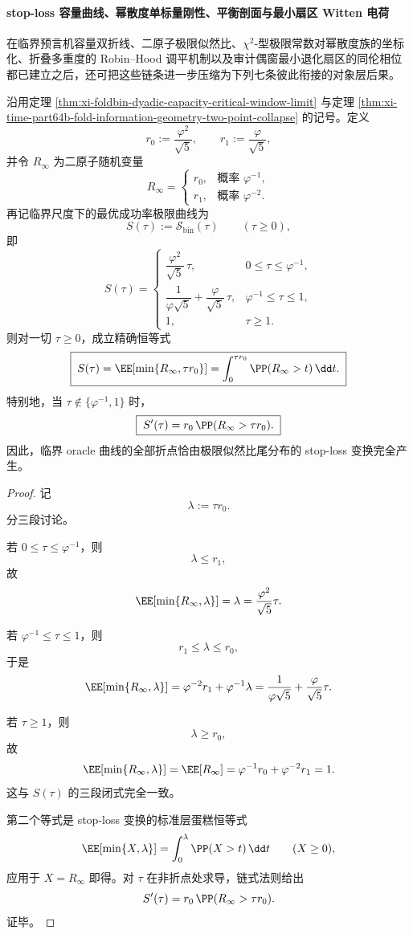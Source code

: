 \paragraph{stop-loss 容量曲线、幂散度单标量刚性、平衡剖面与最小扇区 Witten 电荷}
在临界预言机容量双折线、二原子极限似然比、\(\chi^2\)-型极限常数对幂散度族的坐标化、折叠多重度的 Robin--Hood 调平机制以及审计偶窗最小退化扇区的同伦相位都已建立之后，还可把这些链条进一步压缩为下列七条彼此衔接的对象层后果。

\begin{theorem}\label{thm:xi-time-part64ba-critical-oracle-stoploss-transform}
沿用定理 \ref{thm:xi-foldbin-dyadic-capacity-critical-window-limit} 与定理 \ref{thm:xi-time-part64b-fold-information-geometry-two-point-collapse} 的记号。定义
\[
r_0:=\frac{\varphi^2}{\sqrt5},
\qquad
r_1:=\frac{\varphi}{\sqrt5},
\]
并令 \(R_\infty\) 为二原子随机变量
\[
R_\infty=
\begin{cases}
r_0,& \text{概率 } \varphi^{-1},\\[1mm]
r_1,& \text{概率 } \varphi^{-2}.
\end{cases}
\]
再记临界尺度下的最优成功率极限曲线为
\[
S(\tau):=\mathcal S_{\mathrm{bin}}(\tau)
\qquad (\tau\ge 0),
\]
即
\[
S(\tau)=
\begin{cases}
\dfrac{\varphi^2}{\sqrt5}\,\tau,& 0\le \tau\le \varphi^{-1},\\[3mm]
\dfrac{1}{\varphi\sqrt5}+\dfrac{\varphi}{\sqrt5}\,\tau,& \varphi^{-1}\le \tau\le 1,\\[3mm]
1,& \tau\ge 1.
\end{cases}
\]
则对一切 \(\tau\ge 0\)，成立精确恒等式
\[
\boxed{\;
S(\tau)=\EE\!\left[\min\{R_\infty,\tau r_0\}\right]
=
\int_{0}^{\tau r_0}\PP(R_\infty>t)\,\dd t.\;}
\]
特别地，当 \(\tau\notin\{\varphi^{-1},1\}\) 时，
\[
\boxed{\;
S'(\tau)=r_0\,\PP(R_\infty>\tau r_0).\;}
\]
因此，临界 oracle 曲线的全部折点恰由极限似然比尾分布的 stop-loss 变换完全产生。
\end{theorem}
\begin{proof}
记
\[
\lambda:=\tau r_0.
\]
分三段讨论。

若 \(0\le \tau\le \varphi^{-1}\)，则
\[
\lambda\le r_1,
\]
故
\[
\EE[\min\{R_\infty,\lambda\}]=\lambda=\frac{\varphi^2}{\sqrt5}\tau.
\]

若 \(\varphi^{-1}\le \tau\le 1\)，则
\[
r_1\le \lambda\le r_0,
\]
于是
\[
\EE[\min\{R_\infty,\lambda\}]
=
\varphi^{-2}r_1+\varphi^{-1}\lambda
=
\frac{1}{\varphi\sqrt5}+\frac{\varphi}{\sqrt5}\tau.
\]

若 \(\tau\ge 1\)，则
\[
\lambda\ge r_0,
\]
故
\[
\EE[\min\{R_\infty,\lambda\}]
=
\EE[R_\infty]
=
\varphi^{-1}r_0+\varphi^{-2}r_1
=1.
\]
这与 \(S(\tau)\) 的三段闭式完全一致。

第二个等式是 stop-loss 变换的标准层蛋糕恒等式
\[
\EE[\min\{X,\lambda\}]=\int_0^\lambda \PP(X>t)\,\dd t
\qquad (X\ge 0),
\]
应用于 \(X=R_\infty\) 即得。对 \(\tau\) 在非折点处求导，链式法则给出
\[
S'(\tau)=r_0\,\PP(R_\infty>\tau r_0).
\]
证毕。
\end{proof}

